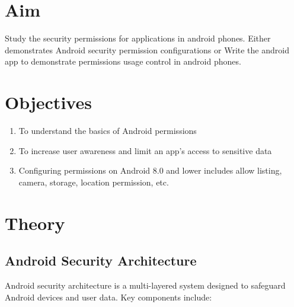 \documentclass[11pt]{article}
\begin{document}
\tableofcontents
\thispagestyle{empty}
\clearpage

\setcounter{page}{1}

\section{Aim}
Study the security permissions for applications in android phones. Either
demonstrates Android security permission configurations or Write the android app
to demonstrate permissions usage control in android phones.

\section{Objectives}

\begin{enumerate}
    \item To understand the basics of Android permissions
    \item To increase user awareness and limit an app's access to sensitive data
    \item Configuring permissions on Android 8.0 and lower includes allow listing, camera,
          storage, location permission, etc.
\end{enumerate}

\section{Theory}

\subsection{Android Security Architecture}

Android security architecture is a multi-layered system designed to safeguard Android devices and user data. Key components include:
\end{document}
